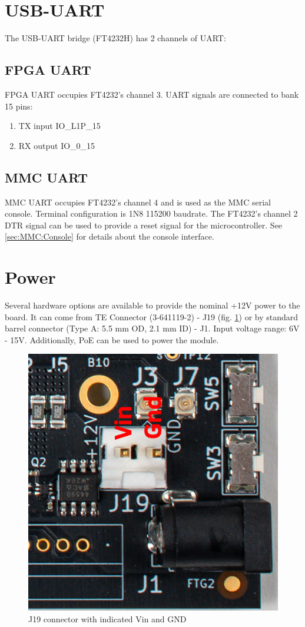 \documentclass[12pt,oneside,a4]{article}
\begin{document}
\section{USB-UART}
The USB-UART bridge (FT4232H) has 2 channels of UART:
\subsection{FPGA UART}
FPGA UART occupies FT4232's channel 3. UART signals are connected to bank 15 pins:
\begin{enumerate}
	\item TX input IO\_L1P\_15
	\item RX output IO\_0\_15
\end{enumerate}
\subsection{MMC UART}
MMC UART occupies FT4232's channel 4 and is used as the MMC serial console. Terminal configuration is 1N8 115200 baudrate. The FT4232's channel 2 DTR signal can be used to provide a reset signal for the microcontroller.
See \ref{sec:MMC:Console} for details about the console interface.


\section{Power}
Several hardware options are available to provide the nominal +12V power to the board.
It can come from TE Connector (3-641119-2) - J19 (fig. \ref{j19}) or by standard barrel connector (Type A: 5.5 mm OD, 2.1 mm ID) - J1. Input voltage range: 6V - 15V. Additionally, PoE can be used to power the module.

\begin{figure}[H]
\begin{center}
\includegraphics[width=0.6\linewidth]{j1j19.png}
 \caption{J19 connector with indicated Vin and GND}\label{j19}
\end{center}
\end{figure}
\end{document}
